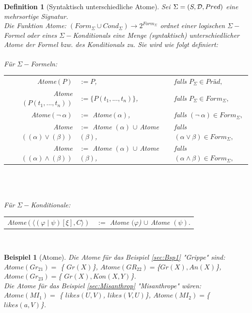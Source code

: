 \documentclass[a4paper, 11pt]{book}
\newtheorem{Def}{Definition }[section]
\newtheorem{Bsp}{Beispiel}[section]
\begin{document}
\begin{Def}[Syntaktisch unterschiedliche Atome]\cite[Kap. 6.2., S. 131/132, Def. 6.2.12]{Fis10}
Sei $ \Sigma = (S,\\ {\cal D}, Pred) $ eine mehrsortige Signatur.\\
Die Funktion Atome: $ (Form_{\Sigma} \cup Cond_{\Sigma}) \rightarrow 2^{Form_{\Sigma}}$ ordnet einer logischen $ \Sigma- $Formel oder eines $ \Sigma- $Konditionals eine Menge (syntaktisch) unterschiedlicher Atome der Formel bzw. des Konditionals zu.
Sie wird wie folgt definiert:\\
\\Für $ \Sigma- $Formeln: 

\begin{tabular}{rll}
Atome$ (P) $ & $ := {P} $, & falls $ P_{\Sigma} \in Präd,$ \\
Atome$ (P(t_1, ..., t_n)) $ & $ := \{P(t_1, ..., t_n)\} $, & falls $ P_{\Sigma} \in Form_{\Sigma},$ \\
Atome$ (\neg ~ \alpha) $ & $ := $ Atome$ (\alpha) $, & falls $ (\neg ~ \alpha) \in Form_{\Sigma},$ \\
Atome$ ((\alpha) \vee (\beta)) $ & $ := $ Atome $ (\alpha) $  $ \cup$ Atome $ (\beta) $, & falls $ (\alpha \vee \beta) \in Form_{\Sigma},$ \\
Atome$ ((\alpha) \wedge (\beta)) $ & $ := $ Atome $ (\alpha) $  $ \cup$ Atome $ (\beta) $, & falls $ (\alpha \wedge \beta) \in Form_{\Sigma},$ \\
\end{tabular}\\ 
\\
\\
Für $ \Sigma- $Konditionale:

\begin{tabular}{rl}
Atome$(  \langle (\varphi \mid \psi)[\xi], C \rangle) $ & $ :=   $ Atome $ (\varphi$) $ \cup $  Atome $ (\psi ).$ \\
\end{tabular}
\\
\end{Def}


\begin{Bsp}[Atome]
Die Atome für das Beispiel \ref{sec:Bsp1} "{}Grippe"{}  sind:\\
$ Atome(Gr_{21}) = $  \{ $Gr(X) $\}, $ Atome(GR_{22}) = $\{$Gr(X), An(X)$\},  $Atome(Gr_{23}) = $\{ $Gr(X), Kon(X, Y) $\}. \\

Die Atome für das Beispiel \ref{sec:Misanthrop} "{}Misanthrope"{} wären:\\
$ Atome(MI_{1}) = $  \{ $likes(U, V) $, $likes(V, U) $\}, $Atome(MI_{2}) = $\{ $likes(a, V)  $\}. \\
\\
\end{Bsp}
\end{document}
